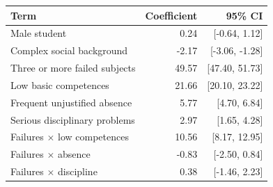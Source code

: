 \begin{tabular}{lrr}
\toprule
Term & Coefficient & 95\% CI \\
\midrule
Male student & 0.24 & [-0.64, 1.12] \\
Complex social background & -2.17 & [-3.06, -1.28] \\
Three or more failed subjects & 49.57 & [47.40, 51.73] \\
Low basic competences & 21.66 & [20.10, 23.22] \\
Frequent unjustified absence & 5.77 & [4.70, 6.84] \\
Serious disciplinary problems & 2.97 & [1.65, 4.28] \\
Failures $\times$ low competences & 10.56 & [8.17, 12.95] \\
Failures $\times$ absence & -0.83 & [-2.50, 0.84] \\
Failures $\times$ discipline & 0.38 & [-1.46, 2.23] \\
\bottomrule
\end{tabular}
